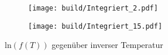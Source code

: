 \begin{figure}
  \centering
  \begin{subfigure}{0.4\textwidth}
    \centering
    \texttt{[image: build/Integriert\_2.pdf]}
  \end{subfigure}
  \begin{subfigure}{0.4\textwidth}
    \centering
    \texttt{[image: build/Integriert\_15.pdf]}
  \end{subfigure}
  \caption{$\text{ln}(f(T))$ gegenüber inverser Temperatur}
  \label{fig:Integriert}
\end{figure}
